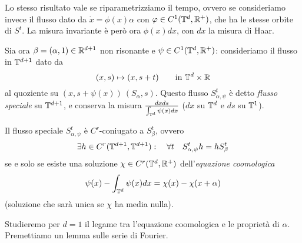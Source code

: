 Lo stesso risultato vale se riparametrizziamo il tempo, ovvero se consideriamo invece il flusso dato da $\dot x=\phi(x)\alpha$ con $\varphi\in C^1(\mathbb{T}^d,\mathbb{R}^+)$, 
che ha le stesse orbite di $S^t$. La misura invariante è però ora $\phi(x)dx$, con $dx$ la misura di Haar.

Sia ora $\beta=(\alpha,1)\in \mathbb{R}^{d+1}$ non risonante e $\psi\in C^1(\mathbb{T}^d,\mathbb{R}^+)$: consideriamo il flusso in $\mathbb{T}^{d+1}$ dato da 
\[(x,s)\mapsto(x,s+t) \qquad \mbox{in }\mathbb{T}^d\times \mathbb{R}\]
al quoziente su $(x,s+\psi(x))~(S_\alpha,s)$. Questo flusso $S^t_{\alpha,\psi}$ è detto \emph{flusso speciale} su $\mathbb{T}^{d+1}$, 
e conserva la misura $\frac{dxds}{\int_{\mathbb{T}^d}\psi(x)dx}$ ($dx$ su $\mathbb{T}^d$ e $ds$ su $\mathbb{T}^1$).

\begin{teo}Il flusso speciale $S^t_{\alpha,\psi}$ è $C^r$-coniugato a $S^t_\beta$, ovvero
 \[\exists h\in C^r(\mathbb{T}^{d+1},\mathbb{T}^{d+1}):\quad \forall t \quad S^t_{\alpha,\psi}h=hS^t_\beta\]
 se e solo se esiste una soluzione $\chi\in C^r(\mathbb{T}^d,\mathbb{R}^+)$ dell'\emph{equazione coomologica}
 \[\psi(x)-\int_{\mathbb{T}^d}\psi(x)dx=\chi(x)-\chi(x+\alpha)\]
 (soluzione che sarà unica se $\chi$ ha media nulla).
\end{teo}

Studieremo per $d=1$ il legame tra l'equazione coomologica e le proprietà di $\alpha$. Premettiamo un lemma sulle serie di Fourier.

